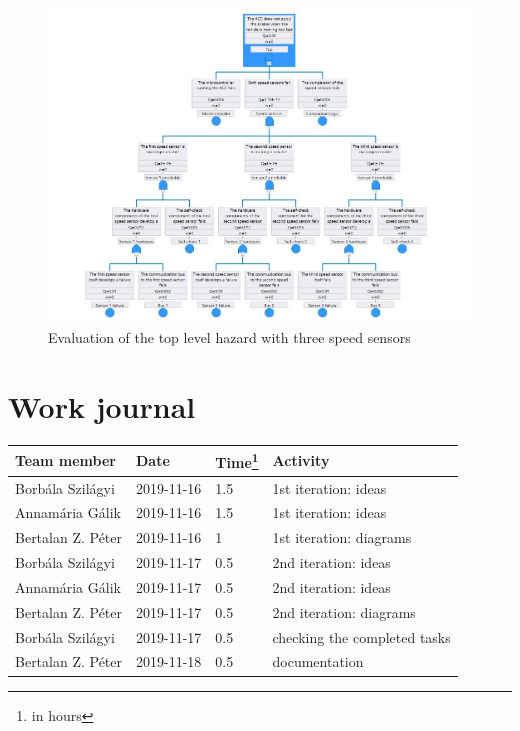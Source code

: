 \documentclass[a4paper]{article}
\begin{document}
\begin{figure}
	\centering
	\includegraphics[width=\textwidth]{eval_imsc.jpg}
	\caption{Evaluation of the top level hazard with three speed sensors}%
	\label{fig:eval_imsc}
\end{figure}



\section{Work journal}

\begin{tabularx}{\textwidth}{l l l X}
	\toprule
	Team member & Date & Time\footnote{in hours} & Activity \\ \midrule

	Borbála Szilágyi  & 2019-11-16 & 1.5 & 1st iteration: ideas         \\
	Annamária Gálik   & 2019-11-16 & 1.5 & 1st iteration: ideas         \\
	Bertalan Z. Péter & 2019-11-16 & 1   & 1st iteration: diagrams      \\
	Borbála Szilágyi  & 2019-11-17 & 0.5 & 2nd iteration: ideas         \\
	Annamária Gálik   & 2019-11-17 & 0.5 & 2nd iteration: ideas         \\
	Bertalan Z. Péter & 2019-11-17 & 0.5 & 2nd iteration: diagrams      \\
	Borbála Szilágyi  & 2019-11-17 & 0.5 & checking the completed tasks \\
	Bertalan Z. Péter & 2019-11-18 & 0.5 & documentation                \\
	\bottomrule
\end{tabularx}

\clearpage
\printglossaries
\end{document}
